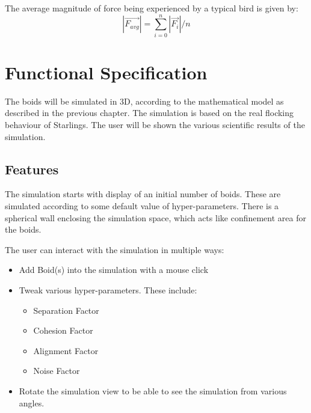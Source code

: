 \documentclass[a4paper,12pt,openany]{book}
\begin{document}
The average magnitude of force being experienced by a typical bird is given by:
\begin{equation}
|\vec{F_{avg}}| = \sum_{i=0}^{n} |\vec{F_i}| / n
\end{equation}

\chapter{Functional Specification}



The boids will be simulated in 3D, according to the mathematical model as described in the previous chapter. The simulation is based on the real flocking behaviour of Starlings. The user will be shown the various scientific results of the simulation.

\section{Features}

The simulation starts with display of an initial number of boids. These are simulated according to some default value of hyper-parameters. There is a spherical wall enclosing the simulation space, which acts like confinement area for the boids.

The user can interact with the simulation in multiple ways:
\begin{itemize}

\item Add Boid(s) into the simulation with a mouse click
\item Tweak various hyper-parameters. These include:
\begin{itemize}
\item Separation Factor
\item Cohesion Factor
\item Alignment Factor
\item Noise Factor
\end{itemize} 

\item Rotate the simulation view to be able to see the simulation from various angles.

\end{itemize}
\newpage
\end{document}

